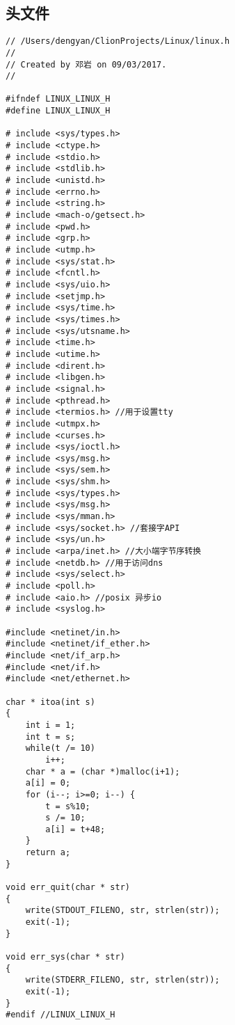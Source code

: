 \subsection{头文件}
\begin{verbatim}
// /Users/dengyan/ClionProjects/Linux/linux.h
//
// Created by 邓岩 on 09/03/2017.
//

#ifndef LINUX_LINUX_H
#define LINUX_LINUX_H

# include <sys/types.h>
# include <ctype.h>
# include <stdio.h>
# include <stdlib.h>
# include <unistd.h>
# include <errno.h>
# include <string.h>
# include <mach-o/getsect.h>
# include <pwd.h>
# include <grp.h>
# include <utmp.h>
# include <sys/stat.h>
# include <fcntl.h>
# include <sys/uio.h>
# include <setjmp.h>
# include <sys/time.h>
# include <sys/times.h>
# include <sys/utsname.h>
# include <time.h>
# include <utime.h>
# include <dirent.h>
# include <libgen.h>
# include <signal.h>
# include <pthread.h>
# include <termios.h> //用于设置tty
# include <utmpx.h>
# include <curses.h>
# include <sys/ioctl.h>
# include <sys/msg.h>
# include <sys/sem.h>
# include <sys/shm.h>
# include <sys/types.h>
# include <sys/msg.h>
# include <sys/mman.h>
# include <sys/socket.h> //套接字API
# include <sys/un.h>
# include <arpa/inet.h> //大小端字节序转换
# include <netdb.h> //用于访问dns
# include <sys/select.h>
# include <poll.h>
# include <aio.h> //posix 异步io
# include <syslog.h>

#include <netinet/in.h>
#include <netinet/if_ether.h>
#include <net/if_arp.h>
#include <net/if.h>
#include <net/ethernet.h>

char * itoa(int s)
{
    int i = 1;
    int t = s;
    while(t /= 10)
        i++;
    char * a = (char *)malloc(i+1);
    a[i] = 0;
    for (i--; i>=0; i--) {
        t = s%10;
        s /= 10;
        a[i] = t+48;
    }
    return a;
}

void err_quit(char * str)
{
    write(STDOUT_FILENO, str, strlen(str));
    exit(-1);
}

void err_sys(char * str)
{
    write(STDERR_FILENO, str, strlen(str));
    exit(-1);
}
#endif //LINUX_LINUX_H

\end{verbatim}